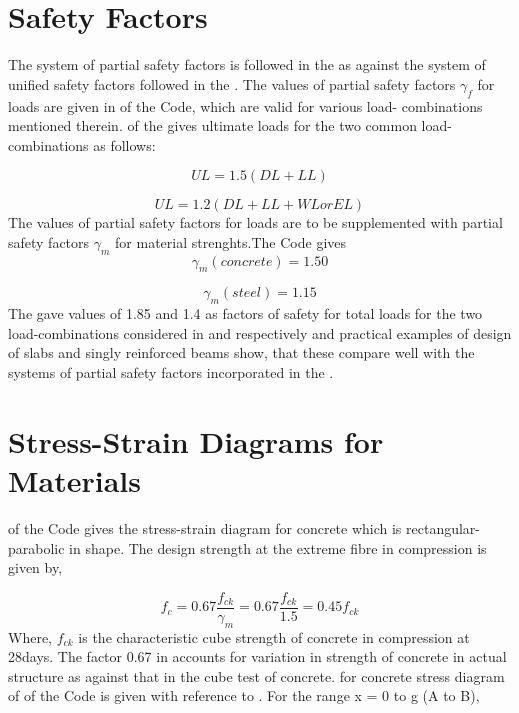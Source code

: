 \section{Safety Factors}

The system of partial safety factors is followed in the
 as against the system of uniﬁed safety factors
followed in the . The values of partial safety
factors ${\gamma_f}$ for loads are given in  of the Code, which
are valid for various load- combinations mentioned therein. 
of the  gives ultimate loads for the two common
load-combinations as follows:

\begin{equation}
UL = 1.5 (DL + LL)
\end{equation}

\begin{equation}
UL = 1.2 (DL + LL + WL or EL)
\end{equation}
The values of partial safety factors for loads are to be supplemented
with partial safety factors $\gamma_m$ for material strenghts.The Code gives           
\begin{equation}
\gamma_m (concrete) = 1.50
\end{equation}

\begin{equation}
\gamma_m (steel) = 1.15 
\end{equation}
The  gave values of 1.85 and 1.4 as factors of
safety for total loads for the two load-combinations considered in
 and  respectively and practical examples of design of
slabs and singly reinforced beams show, that these compare well with the
systems of partial safety factors incorporated in the
.

\section{Stress-Strain Diagrams for Materials}

 of the Code gives the stress-strain diagram for concrete which
is rectangular-parabolic in shape. The design strength at the extreme
fibre in compression is given by,

\begin{equation}
f_c = 0.67\frac{f_{ck}}{\gamma_m} = 0.67\frac{f_{ck}}{1.5}=0.45 f_{ck}
\end{equation}
Where, $f_{ck}$ is the characteristic cube strength of concrete in
compression at 28days. The factor 0.67 in  accounts for
variation in strength of concrete in actual structure as against
that in the cube test of concrete. \eqn for concrete stress diagram
of  of the Code is given with reference to . For the
range x = 0 to g (A to B),

